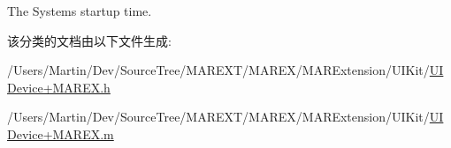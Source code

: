The System\textquotesingle{}s startup time. 



该分类的文档由以下文件生成\+:\begin{DoxyCompactItemize}
\item 
/\+Users/\+Martin/\+Dev/\+Source\+Tree/\+M\+A\+R\+E\+X\+T/\+M\+A\+R\+E\+X/\+M\+A\+R\+Extension/\+U\+I\+Kit/\hyperlink{_u_i_device_09_m_a_r_e_x_8h}{U\+I\+Device+\+M\+A\+R\+E\+X.\+h}\item 
/\+Users/\+Martin/\+Dev/\+Source\+Tree/\+M\+A\+R\+E\+X\+T/\+M\+A\+R\+E\+X/\+M\+A\+R\+Extension/\+U\+I\+Kit/\hyperlink{_u_i_device_09_m_a_r_e_x_8m}{U\+I\+Device+\+M\+A\+R\+E\+X.\+m}\end{DoxyCompactItemize}
